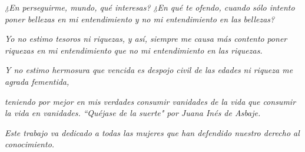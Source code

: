   
{}

\begin{flushleft}
\textit{¿En perseguirme, mundo, qué interesas?}\newline
\textit{¿En qué te ofendo, cuando sólo intento}\newline
\textit{poner bellezas en mi entendimiento}\newline
\textit{y no mi entendimiento en las bellezas?}\newline

\textit{Yo no estimo tesoros ni riquezas,}\newline
\textit{y así, siempre me causa más contento}\newline
\textit{poner riquezas en mi entendimiento}\newline
\textit{que no mi entendimiento en las riquezas.}\newline

\textit{Y no estimo hermosura que vencida}\newline
\textit{es despojo civil de las edades}\newline
\textit{ni riqueza me agrada fementida,}\newline

\textit{teniendo por mejor en mis verdades}\newline
\textit{consumir vanidades de la vida}\newline
\textit{que consumir la vida en vanidades.}\newline
\textit{``Quéjase de la suerte" por Juana Inés de Asbaje.}\newline
\end{flushleft}
\textit{Este trabajo va dedicado a todas las mujeres que han defendido nuestro derecho al conocimiento.}

\clearpage